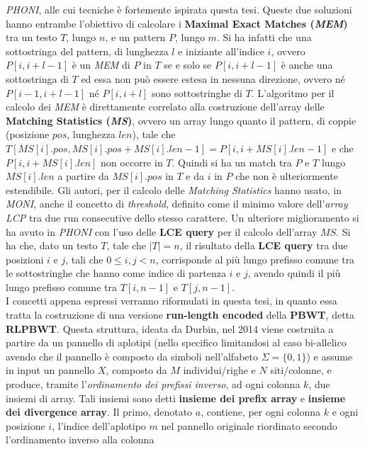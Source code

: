\documentclass[a4paper,11pt, oneside]{article}
\begin{document}
\textit{PHONI}, alle cui tecniche è fortemente ispirata questa tesi. Queste due
soluzioni hanno entrambe l'obiettivo di 
calcolare i \textbf{Maximal Exact Matches (\textit{MEM})} tra un testo $T$,
lungo $n$, e un pattern $P$, lungo $m$. Si ha infatti che una sottostringa del
pattern, di lunghezza $l$ e iniziante all'indice $i$, ovvero $P[i,i+l-1]$ è un
\textit{MEM} di $P$ in $T$ 
se e solo se $P[i,i+l-1]$ è anche una sottostringa di $T$ ed essa non può essere
estesa 
in nessuna direzione, ovvero né $P[i-1,i+l-1]$ né $P[i,i+l]$ sono
sottostringhe di $T$. L'algoritmo per il calcolo dei \textit{MEM} è direttamente
correlato alla costruzione dell'array delle \textbf{Matching Statistics
  (\textit{MS})}, 
ovvero un array lungo quanto il pattern, di coppie (posizione $pos$, lunghezza
$len$), tale 
che 
$T[MS[i].pos,MS[i].pos+MS[i].len-1]=P[i,i+MS[i].len-1]$ e che $P[i,i+MS[i].len]$ 
non occorre in $T$. Quindi si ha un match tra $P$ e $T$ lungo $MS[i].len$ a
partire da $MS[i].pos$ in $T$ e da $i$ in $P$ che non è ulteriormente
estendibile. Gli autori, per il calcolo delle \textit{Matching Statistics} hanno
usato, in \textit{MONI}, anche il concetto di \textit{threshold}, definito come
il minimo valore dell'\textit{array LCP} tra due run consecutive dello stesso
carattere. Un 
ulteriore miglioramento si ha avuto in \textit{PHONI} con l'uso delle
\textbf{LCE query} per il calcolo dell'array $MS$. Si ha che, dato un testo $T$,
tale che $|T|=n$, il risultato della \textbf{LCE query} tra 
due posizioni $i$ e $j$, tali che $0\leq i,j<n$, corrisponde al più lungo
prefisso comune tra le sottostringhe che hanno come indice di partenza $i$ e
$j$, avendo quindi il più lungo prefisso comune tra $T[i,n-1]$ e
$T[j,n-1]$.\\
I concetti appena espressi verranno riformulati in questa tesi, in quanto essa
tratta la costruzione di una versione \textbf{run-length encoded} della
\textbf{PBWT}, detta \textbf{RLPBWT}. Questa struttura, ideata da Durbin, nel
2014 viene costruita a partire da un 
pannello di aplotipi (nello specifico limitandosi al caso bi-allelico avendo che
il pannello è composto da simboli nell'alfabeto $\Sigma=\{0,1\}$) e 
assume in input un pannello $X$, composto da $M$ individui/righe e $N$
siti/colonne, e produce, tramite l'\textit{ordinamento dei prefissi inverso}, ad
ogni colonna $k$, due insiemi di array. Tali insiemi sono detti \textbf{insieme
  dei prefix array} e \textbf{insieme dei divergence array}. Il primo, denotato
$a$, contiene, per ogni colonna $k$ e ogni posizione $i$, l'indice dell'aplotipo
$m$ nel pannello originale riordinato secondo l'ordinamento inverso alla colonna
\end{document}
